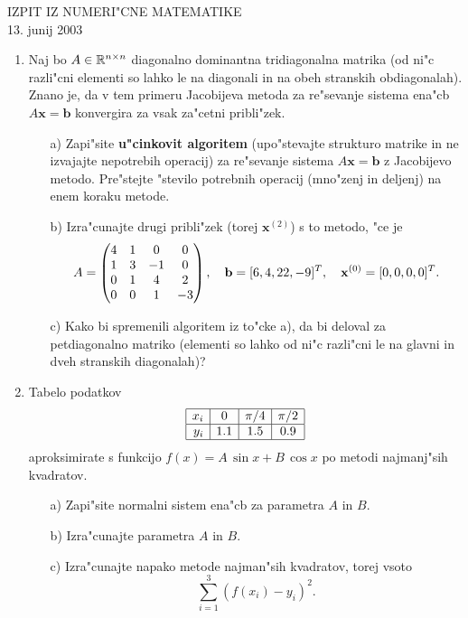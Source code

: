 
\begin{center}
  IZPIT IZ NUMERI"CNE MATEMATIKE\\
  13. junij 2003
\end{center}
\vspace{1cm}

\begin{enumerate}

  \item Naj bo $A\in\mathbb{R}^{n\times n}$ diagonalno dominantna tridiagonalna
   matrika (od ni"c razli"cni elementi so lahko le na diagonali in na
   obeh stranskih obdiagonalah). Znano je, da v tem primeru Jacobijeva
   metoda za re"sevanje sistema ena"cb $A\mathbf{x}=\mathbf{b}$
   konvergira za vsak za"cetni pribli"zek.
  \begin{itemize}
     \item[a)] Zapi"site {\bf u"cinkovit algoritem} 
     (upo"stevajte strukturo matrike in ne
     izvajajte nepotrebih operacij) za re"sevanje sistema
     $A\mathbf{x}=\mathbf{b}$ z Jacobijevo metodo. Pre"stejte "stevilo potrebnih
     operacij (mno"zenj in deljenj) na enem koraku metode.
     \item[b)] Izra"cunajte drugi pribli"zek
     (torej $\mathbf{x}^{(2)}$) s to metodo, "ce je
     $$A=\begin{pmatrix}4 & 1 & 0 & 0\cr 1 & 3 & -1 & 0\cr
                0 & 1 & 4 & 2\cr 0 & 0 & 1 & -3
              \end{pmatrix},
     \quad \mathbf{b}=[6,4,22,-9]^T,\quad
         \mathbf{x}^{(0)}=[0,0,0,0]^T.$$
     \item[c)] Kako bi spremenili algoritem iz to"cke a), da bi deloval
     za petdiagonalno matriko (elementi so lahko od ni"c razli"cni le 
     na glavni in dveh stranskih diagonalah)?
  \end{itemize}
 
  \item Tabelo podatkov
    $$\begin{array}{|r|c|c|c|}
        \hline
         x_i & 0 & \pi/4 & \pi/2 \\ \hline
         y_i & 1.1 & 1.5 & 0.9 \\ \hline
      \end{array}
    $$
    aproksimirate s funkcijo $f(x)=A\,\sin{x}+B\,\cos{x}$ po metodi 
    najmanj"sih kvadratov.
    \begin{itemize}
      \item[a)] Zapi"site normalni sistem ena"cb za parametra $A$ in $B$.
      \item[b)] Izra"cunajte parametra $A$ in $B$.
      \item[c)] Izra"cunajte napako metode najman"sih kvadratov, torej
      vsoto 
      $$\sum_{i=1}^3(f(x_i)-y_i)^2.$$

     \end{itemize}
\end{enumerate}
   





         
